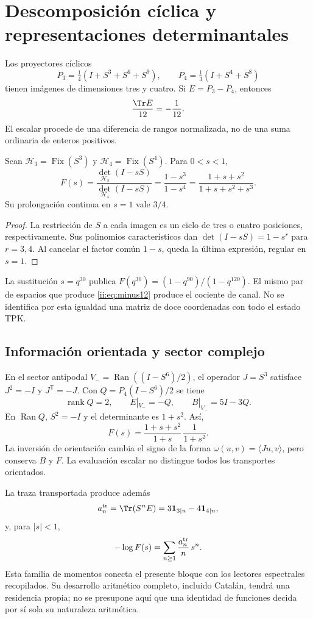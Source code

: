 \section{Descomposición cíclica y representaciones determinantales}
Los proyectores cíclicos
\[
P_3=\tfrac14(I+S^3+S^6+S^9),\qquad
P_4=\tfrac13(I+S^4+S^8)
\]
tienen imágenes de dimensiones tres y cuatro. Si $E=P_3-P_4$, entonces
\begin{equation}
\frac{\Tr E}{12}=-\frac1{12}.
\label{ii:eq:minus12}
\end{equation}
El escalar procede de una diferencia de rangos normalizada, no de una
suma ordinaria de enteros positivos.

\begin{theorem}
Sean $\mathcal H_3=\operatorname{Fix}(S^3)$ y
$\mathcal H_4=\operatorname{Fix}(S^4)$. Para $0<s<1$,
\begin{equation}
F(s)=\frac{\det_{\mathcal H_3}(I-sS)}{\det_{\mathcal H_4}(I-sS)}
=\frac{1-s^3}{1-s^4}
=\frac{1+s+s^2}{1+s+s^2+s^3}.
\label{ii:eq:det}
\end{equation}
Su prolongación continua en $s=1$ vale $3/4$.
\end{theorem}
\begin{proof}
La restricción de $S$ a cada imagen es un ciclo de tres o cuatro
posiciones, respectivamente. Sus polinomios característicos dan
$\det(I-sS)=1-s^r$ para $r=3,4$. Al cancelar el factor común $1-s$,
queda la última expresión, regular en $s=1$.
\end{proof}

La sustitución $s=q^{30}$ publica
$F(q^{30})=(1-q^{90})/(1-q^{120})$.
El mismo par de espacios que produce \eqref{ii:eq:minus12}
produce el cociente de canal. No se identifica por esta igualdad
una matriz de doce coordenadas con todo el estado TPK.

\subsection{Información orientada y sector complejo}
En el sector antipodal $V_-=\operatorname{Ran}((I-S^6)/2)$,
el operador $J=S^3$ satisface $J^2=-I$ y $J^{\mathsf T}=-J$.
Con $Q=P_4(I-S^6)/2$ se tiene
\[
\operatorname{rank}Q=2,\qquad E|_{V_-}=-Q,\qquad B|_{V_-}=5I-3Q.
\]
En $\operatorname{Ran}Q$, $S^2=-I$ y el determinante es $1+s^2$.
Así,
\[
F(s)=\frac{1+s+s^2}{1+s}\,\frac1{1+s^2}.
\]
La inversión de orientación cambia el signo de la forma
$\omega(u,v)=\langle Ju,v\rangle$, pero conserva $B$ y $F$.
La evaluación escalar no distingue todos los transportes orientados.

La traza transportada produce además
\[
a_n^{\rm tr}=\Tr(S^nE)=3\mathbf1_{3\mid n}-4\mathbf1_{4\mid n},
\]
y, para $|s|<1$,
\[
-\log F(s)=\sum_{n\ge1}\frac{a_n^{\rm tr}}n\,s^n.
\]
Esta familia de momentos conecta el presente bloque con los lectores
espectrales recopilados. Su desarrollo aritmético completo, incluido
Catalán, tendrá una residencia propia; no se presupone aquí que una
identidad de funciones decida por sí sola su naturaleza aritmética.

